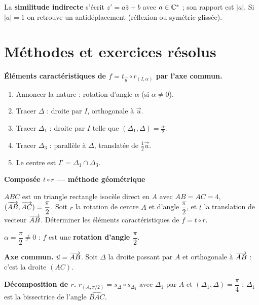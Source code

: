 \begin{astucebac}
	La \textbf{similitude indirecte} s'écrit $z' = a\bar z + b$ avec
	$a\in\mathbb{C}^*$ ; son rapport est $|a|$. Si $|a|=1$ on retrouve un
	antidéplacement (réflexion ou symétrie glissée).
\end{astucebac}


\section{Méthodes et exercices résolus}

\begin{methode}
	\textbf{Éléments caractéristiques de $f=t_{\vec u}\circ r_{(I,\alpha)}$ par
	l'axe commun.}
	\begin{enumerate}
		\item Annoncer la nature : rotation d'angle $\alpha$ (si $\alpha\neq0$).
		\item Tracer $\Delta$ : droite par $I$, orthogonale à $\vec u$.
		\item Tracer $\Delta_1$ : droite par $I$ telle que $(\Delta_1,\Delta)=\tfrac{\alpha}{2}$.
		\item Tracer $\Delta_3$ : parallèle à $\Delta$, translatée de $\tfrac12\vec u$.
		\item Le centre est $I'=\Delta_1\cap\Delta_3$.
	\end{enumerate}
\end{methode}

\exerciceresolu
\textbf{Composée $t\circ r$ — méthode géométrique}

$ABC$ est un triangle rectangle isocèle direct en $A$ avec $AB=AC=4$,
$(\overrightarrow{AB},\overrightarrow{AC})=\dfrac{\pi}{2}$. Soit $r$ la rotation de centre $A$
et d'angle $\dfrac{\pi}{2}$, et $t$ la translation de vecteur $\overrightarrow{AB}$.
Déterminer les éléments caractéristiques de $f=t\circ r$.

\solution

$\alpha=\dfrac{\pi}{2}\neq 0$ : $f$ est une \textbf{rotation d'angle
$\dfrac{\pi}{2}$}.

\textbf{Axe commun.} $\vec u=\overrightarrow{AB}$. Soit $\Delta$ la droite passant par
$A$ et orthogonale à $\overrightarrow{AB}$ : c'est la droite $(AC)$.

\textbf{Décomposition de $r$.} $r_{(A,\pi/2)}=s_{\Delta}\circ s_{\Delta_1}$
avec $\Delta_1$ par $A$ et $(\Delta_1,\Delta)=\dfrac{\pi}{4}$ :
$\Delta_1$ est la bissectrice de l'angle $\widehat{BAC}$.

